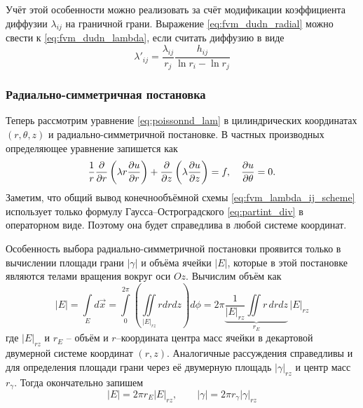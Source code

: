 Учёт этой особенности можно реализовать за счёт модификации
коэффициента диффузии $\lambda_{ij}$ на граничной грани.
Выражение \cref{eq:fvm_dudn_radial}
можно свести к 
\cref{eq:fvm_dudn_lambda},
если считать диффузию в виде
\begin{equation}
\label{eq:fvm_ln_singularity_hij}
\lambda'_{ij} = \frac{\lambda_{ij}}{r_j} \frac{h_{ij}}{\ln r_i - \ln r_j}
\end{equation}

\subsubsection{Радиально-симметричная постановка}
\label{sec:fvm_radsym}
Теперь рассмотрим уравнение
\cref{eq:poissonnd_lam}
в цилиндрических координатах $(r, \theta, z)$ и радиально-симметричной постановке.
В частных производных определяющее уравнение запишется как
\begin{equation*}
\frac{1}{r}\frac{\partial }{\partial r}\left( \lambda r \frac{\partial u}{\partial r} \right) + \frac{\partial }{\partial z}\left(\lambda \frac{\partial u}{\partial z}\right) = f, \quad \frac{\partial u}{\partial \theta} = 0.
\end{equation*}
Заметим, что общий вывод конечнообъёмной схемы
\cref{eq:fvm_lambda_ij_scheme}
использует только формулу Гаусса--Остроградского
\cref{eq:partint_div} в операторном виде.
Поэтому она будет справедлива в любой системе координат.

Особенность выбора радиально-симметричной постановки
проявится только в вычислении площади грани $|\gamma|$
и объёма ячейки $|E|$, которые в этой постановке являются телами
вращения вокруг оси $Oz$.
Вычислим объём как
\begin{equation*}
|E| = \int\limits_{E} d\vec x = \int\limits_0^{2\pi}\left(\iint\limits_{|E|_{rz}} r d r d z\right) d\phi  =
    2\pi \underbrace{\frac{1}{|E|_{rz}}\iint r \, d r d z}_{r_E} \, |E|_{rz} 
\end{equation*}
где $|E|_{rz}$ и $r_E$ -- объём и $r$--координата центра масс ячейки
в декартовой двумерной системе координат $(r, z)$.
Аналогичные рассуждения справедливы и для определения площади грани
через её двумерную площадь $|\gamma|_{rz}$ и центр масс $r_\gamma$.
Тогда окончательно запишем
\begin{equation}
\label{eq:fvm_radsym_measures}
\left|E\right| = 2 \pi r_E |E|_{rz}, \qquad
\left|\gamma\right| = 2 \pi r_\gamma |\gamma|_{rz}
\end{equation}

